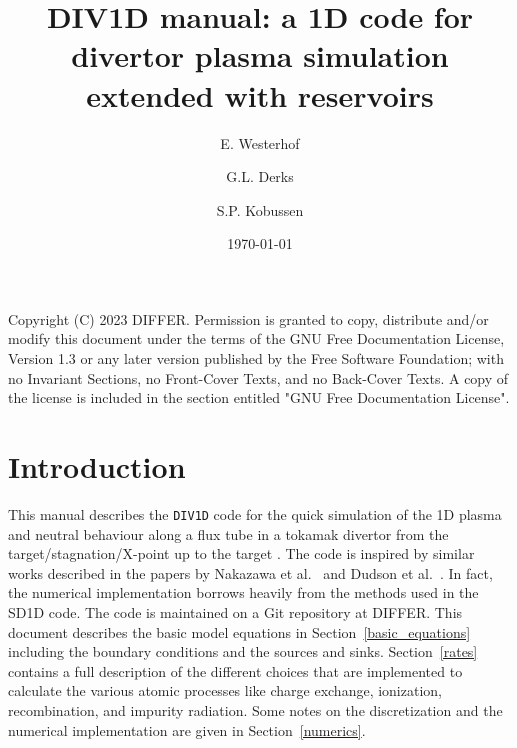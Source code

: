 \documentclass[amsmath,amssymb,a4]{revtex4-2}
\begin{document}
\title[DIV1D manual]{DIV1D manual: a 1D code for divertor plasma simulation \\ extended with reservoirs}

\author{E. Westerhof}
\author{G.L. Derks}
  \author{S.P. Kobussen}
  

    
\address{DIFFER -- Dutch Institute for Fundamental Energy Research, PO Box 6336, 5600HH Eindhoven, The Netherlands, www.differ.nl}

\vspace{10pt}
\date\today




\maketitle

Copyright (C)  2023  DIFFER.
    Permission is granted to copy, distribute and/or modify this document
    under the terms of the GNU Free Documentation License, Version 1.3
    or any later version published by the Free Software Foundation;
    with no Invariant Sections, no Front-Cover Texts, and no Back-Cover Texts.
    A copy of the license is included in the section entitled "GNU
    Free Documentation License".
    
\section{Introduction}

This manual describes the {\tt DIV1D} code for the quick simulation of the 1D plasma and neutral behaviour along a flux tube in a tokamak divertor from the target/stagnation/X-point up to the target \cite{derks2022}. The code is inspired by similar works described in the papers by Nakazawa et al.~\cite{nakazawa2000} and Dudson et al.~\cite{dudson2019, SD1D}. In fact, the numerical implementation borrows heavily from the methods used in the SD1D code. The code is maintained on a Git repository at DIFFER. This document describes the basic model equations in Section~\ref{basic_equations} including the boundary conditions and the sources and sinks. Section~\ref{rates} contains a full description of the different choices that are implemented to calculate the various atomic processes like charge exchange, ionization, recombination, and impurity radiation. Some notes on the discretization and the numerical implementation are given in Section~\ref{numerics}.
\end{document}
